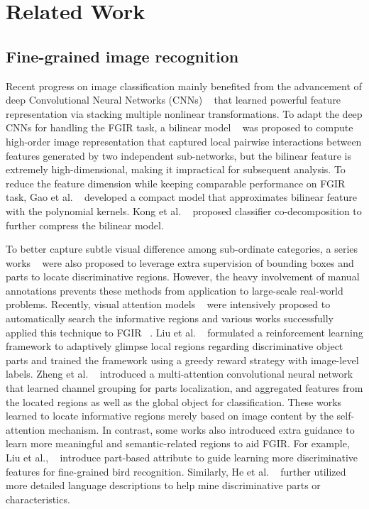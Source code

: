 \documentclass[sigconf]{acmart}
\begin{document}


\section{Related Work}

\subsection{Fine-grained image recognition}
Recent progress on image classification mainly benefited from the advancement of deep Convolutional Neural Networks (CNNs) ~\cite{lecun1998gradient,krizhevsky2012imagenet,simonyan2014very,he2016deep,chen2018learning,chen2016disc} that learned powerful feature representation via stacking multiple nonlinear transformations. To adapt the deep CNNs for handling the FGIR task, a bilinear model ~\cite{lin2015bilinear} was proposed to compute high-order image representation that captured local pairwise interactions between features generated by two independent sub-networks, but the bilinear feature is extremely high-dimensional, making it impractical for subsequent analysis. To reduce the feature dimension while keeping comparable performance on FGIR task, Gao et al. ~\cite{gao2016compact} developed a compact model that approximates bilinear feature with the polynomial kernels. Kong et al. ~\cite{kong2016low} proposed classifier co-decomposition to further compress the bilinear model.

To better capture subtle visual difference among sub-ordinate categories, a series works ~\cite{zhang2014part,huang2016part,zhang2016spda} were also proposed to leverage extra supervision of bounding boxes and parts to locate discriminative regions. However, the heavy involvement of manual annotations prevents these methods from application to large-scale real-world problems. Recently, visual attention models ~\cite{mnih2014recurrent,chen2018recurrent,wang2017multi,liu2018crowd} were intensively proposed to automatically search the informative regions and various works successfully applied this technique to FGIR ~\cite{liu2016fully,fu2017look,zheng2017learning,jaderberg2015spatial}. Liu et al. ~\cite{liu2016fully} formulated a reinforcement learning framework to adaptively glimpse local regions regarding discriminative object parts and trained the framework using a greedy reward strategy with image-level labels. Zheng et al. ~\cite{zheng2017learning} introduced a multi-attention convolutional neural network that learned channel grouping for parts localization, and aggregated features from the located regions as well as the global object for classification. These works learned to locate informative regions merely based on image content by the self-attention mechanism. In contrast, some works also introduced extra guidance to learn more meaningful and semantic-related regions to aid FGIR. For example, Liu et al., ~\cite{liu2017localizing,chen2018knowledge} introduce part-based attribute to guide learning more discriminative features for fine-grained bird recognition. Similarly, He et al. ~\cite{he2017fine} further utilized more detailed language descriptions to help mine discriminative parts or characteristics.
\end{document}
